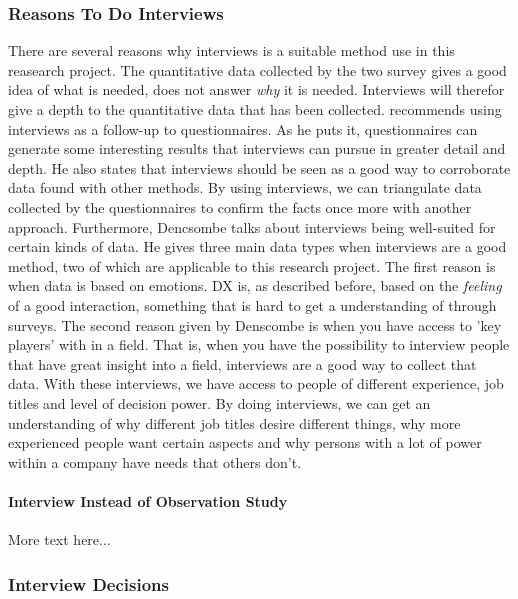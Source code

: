 \documentclass{article}
\begin{document}
\subsubsection{Reasons To Do Interviews}
There are several reasons why interviews is a suitable method use in this reasearch project.
The quantitative data collected
by the two survey gives a good idea of what is needed, does not answer \textit{why} it is needed.
Interviews will therefor give a depth to the quantitative data that has been collected.
\cite{denscombe} recommends using interviews as a follow-up to questionnaires. As he puts it,
questionnaires can generate some interesting results that interviews can pursue
in greater detail and depth. He also states that interviews should be seen as a good way
to corroborate data found with other methods. By using interviews, we can triangulate data
collected by the questionnaires to confirm the facts once more with another approach.
Furthermore, Dencsombe talks about interviews being well-suited for certain kinds of data.
He gives three main data types when interviews are a good method,
two of which are applicable to this research project. The first reason is
when data is based on emotions. DX is, as described before, based on the \textit{feeling}
of a good interaction, something that is hard to get a understanding of through
surveys. The second reason given by Denscombe is when you have access to 'key players'
with in a field. That is, when you have the possibility to interview people
that have great insight into a field, interviews are a good way to collect that data.
With these interviews, we have access to people of different experience, job titles
and level of decision power. By doing interviews, we can get an understanding
of why different job titles desire different things, why more experienced people
want certain aspects and why persons with a lot of power within a company
have needs that others don't.

\paragraph{Interview Instead of Observation Study}
More text here...

\subsubsection{Interview Decisions}
\end{document}
